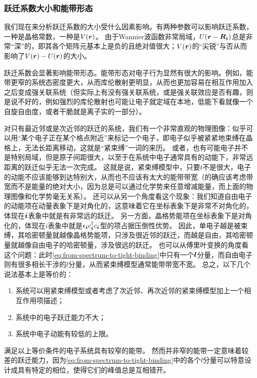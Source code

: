 \subsubsection{跃迁系数大小和能带形态}\label{sec:hopping-and-band-shape}

我们现在来分析跃迁系数的大小受什么因素影响。有两种参数可以影响跃迁系数，一种是晶格常数，一种是$V(\vb*{r})$。
由于Wannier波函数非常局域，$U(\vb*{r} - \vb*{R}_{\vb*{i}})$总是非常“深”的，即其各个矩阵元基本上是负的且绝对值很大；$V(\vb*{r})$的“尖锐”与否从而影响了$V(\vb*{r}) - U(\vb*{r})$的大小。

跃迁系数会显著影响能带形态。能带形态对电子行为显然有很大的影响。例如，能带更窄的系统态密度更大，从而库伦散射更明显，从而也更加容易在相互作用加入之后变成强关联系统（但实际上有没有强关联系统，或是强关联效应是否有趣，则是说不好的，例如强烈的库伦散射也可能让电子就定域在本地，低能下看就像一个自旋自由度，或者干脆就是离子实的一部分）。


对只有最近邻或是次近邻的跃迁的系统，我们有一个非常直观的物理图像：似乎可以用“某个电子正在某个格点附近”来标记一个电子，即电子似乎被紧紧地束缚在晶格上，无法长距离移动，这就是“紧束缚”一词的来历。
或者，也有可能电子并不是特别局域，但是原子间距很大，以至于在系统中电子通常具有的动能下，非常远距离的跃迁似乎无法一次完成。
这就是说，紧束缚模型中，只要$t$不是很大，电子的动能不应该能够到达特别大，从而也不应该有太大的能带带宽（的确应该考虑带宽而不是能量的绝对大小，因为总是可以通过化学势来任意增减能量，而上面的物理图像和化学势毫无关系）。
还可以从另一个角度看这个现象：我们知道自由电子的动能项在动量表象下是对角化的，这意味着它在坐标表象下是非常不对角化的，体现在$\vb*{i}$表象中就是有非常远的跃迁。
另一方面，晶格势能项在坐标表象下是对角化的，体现在$i$表象中就是$\epsilon_{\vb*{i}} c^\dagger_{\vb*{i}} c_{\vb*{i}}$型的项占据压倒性优势。
因此，单电子越是被束缚，其哈密顿量就越像晶格势能项，只涉及很近邻的跃迁，而越是自由，其哈密顿量就越像自由电子的哈密顿量，涉及很远的跃迁。
也可以从傅里叶变换的角度看这个问题：此时\eqref{eq:from-spectrum-to-tight-binding}中只有一个$\vb*{l}$分量，而自由电子则有很多相长干涉的$l$分量，从而紧束缚模型通常能带带宽不宽。
总之，以下几个说法基本上是等价的：
\begin{enumerate}
    \item 系统可以用紧束缚模型或者考虑了次近邻、再次近邻的紧束缚模型加上一个相互作用项描述；
    \item 系统中的电子跃迁能力不大；
    \item 系统中电子动能有较低的上限。
\end{enumerate}
满足以上等价条件的电子系统具有较窄的能带。
然而并非窄的能带一定意味着较差的跃迁能力，因为\eqref{eq:from-spectrum-to-tight-binding}中的各个$l$分量可以特意设计成具有特定的相位，使得它们的峰值总是互相错开。

